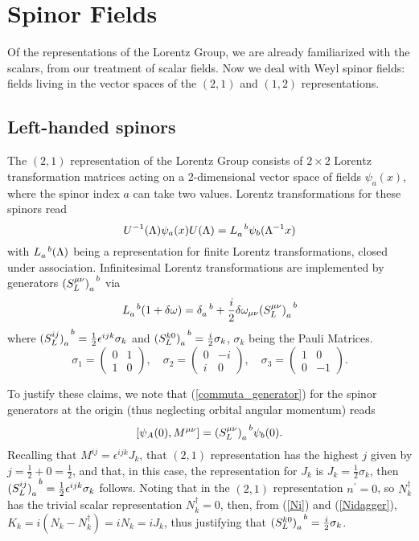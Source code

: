 \chapter{Spinor Fields}
Of the representations of the Lorentz Group, we are already familiarized with the scalars, from our treatment of scalar fields. Now we deal with Weyl spinor fields: fields living in the vector spaces of the $(2,1)$ and $(1,2)$ representations.
\section{Left-handed spinors}
The $({2},1)$ representation of the Lorentz Group consists of $2\times2$ Lorentz transformation matrices acting on a 2-dimensional vector space of fields $\psi_a(x)$, where the spinor index $a$ can take two values.
Lorentz transformations for these spinors read
\begin{equation}
    U^{-1}(\Lambda)\psi_a(x)U(\Lambda)=\tend{L}{a}{b}\psi_b(\Lambda^{-1}x)
\end{equation}
with $\tend{L}{a}{b}(\Lambda)$ being a representation for finite Lorentz transformations, closed under association. Infinitesimal Lorentz transformations are implemented by generators $\tend{(S^{\mu\nu}_L)}{a}{b}$ via
\begin{equation}
    \tend{L}{a}{b}(1+\delta\omega)=\tend{\delta}{a}{b}+\frac{i}{2}\delta\omega_{\mu\nu}\tend{(S^{\mu\nu}_L)}{a}{b}
\end{equation}
where $\tend{(S^{ij}_L)}{a}{b}=\frac{1}{2}\epsilon^{ijk}\sigma_k$ and $\tend{(S^{k0}_L)}{a}{b}=\frac{i}{2}\sigma_k$, $\sigma_k$ being the Pauli Matrices.
\begin{equation}
\sigma_{1}=\left(\begin{array}{ll}
0 & 1 \\
1 & 0
\end{array}\right), \quad \sigma_{2}=\left(\begin{array}{cc}
0 & -i \\
i & 0
\end{array}\right), \quad \sigma_{3}=\left(\begin{array}{cc}
1 & 0 \\
0 & -1
\end{array}\right).
\end{equation}

To justify these claims, we note that (\ref{commuta_generator}) for the spinor generators at the origin (thus neglecting orbital angular momentum) reads
\begin{equation}
    \comm{\psi_A(0)}{M^{\mu\nu}}=\tend{(S^{\mu\nu}_L)}{a}{b}\psi_b(0).
    \label{defining_spinors}
\end{equation}
Recalling that $M^{ij}=\epsilon^{ijk}J_k$, that $(2,1)$ representation has the highest $j$ given by $j=\frac{1}{2}+0=\frac{1}{2}$, and that, in this case, the representation for $J_k$ is $J_k=\frac{1}{2}\sigma_k$, then $\tend{(S^{ij}_L)}{a}{b}=\frac{1}{2}\epsilon^{ijk}\sigma_k$  follows. Noting that in the $(2,1)$ representation $n^\prime=0$, so $N_k^\dagger$ has the trivial scalar representation $N_k^\dagger=0$, then, from (\ref{Ni}) and (\ref{Nidagger}), $K_k=i(N_k-N_k^\dagger)=iN_k=iJ_k$, thus justifying that $\tend{(S^{k0}_L)}{a}{b}=\frac{i}{2}\sigma_k$.

